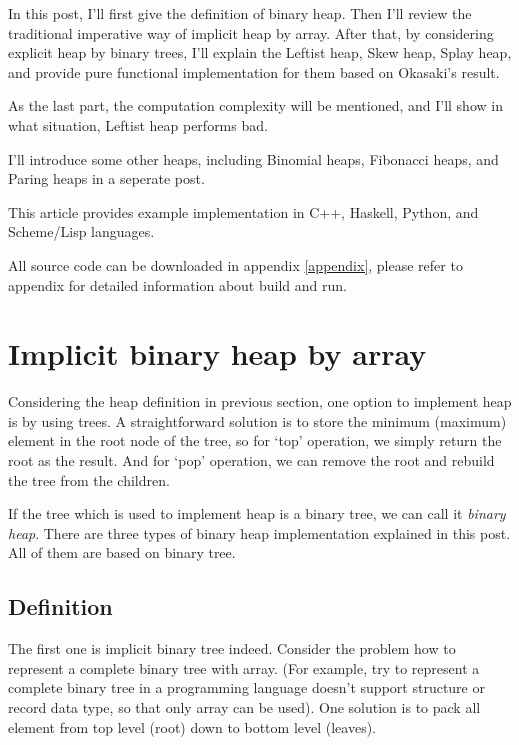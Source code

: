 \documentclass{article}
\begin{document}
In this post, I'll first give the definition of binary heap. Then
I'll review the traditional imperative way of implicit heap by array.
After that, by considering explicit heap by binary trees, I'll
explain the Leftist heap, Skew heap, Splay heap, and provide pure functional implementation
for them based on Okasaki's result\cite{okasaki-book}.

As the last part, the computation complexity will be mentioned, and
I'll show in what situation, Leftist heap performs bad.

I'll introduce some other heaps, including Binomial heaps, Fibonacci
heaps, and Paring heaps in a seperate post.

This article provides example implementation in C++, Haskell, Python, and 
Scheme/Lisp languages. 

All source code can be downloaded in appendix \ref{appendix}, please 
refer to appendix for detailed information about build and run.


\section{Implicit binary heap by array}
\label{ibheap}

Considering the heap definition in previous section, one option to 
implement heap is by using trees. A straightforward solution is
to store the minimum (maximum) element in the root node of the 
tree, so for `top' operation, we simply return the root as the
result. And for `pop' operation, we can remove the root and 
rebuild the tree from the children.

If the tree which is used to implement heap is a binary tree, we
can call it {\em binary heap}. There are three types of binary
heap implementation explained in this post. All of them are
based on binary tree.

\subsection{Definition}

The first one is implicit binary tree indeed. Consider the problem
how to represent a complete binary tree with array. (For example, try to 
represent a complete binary tree in a programming language doesn't support structure
or record data type, so that only array can be used). One solution
is to pack all element from top level (root) down to bottom level (leaves).
\end{document}
